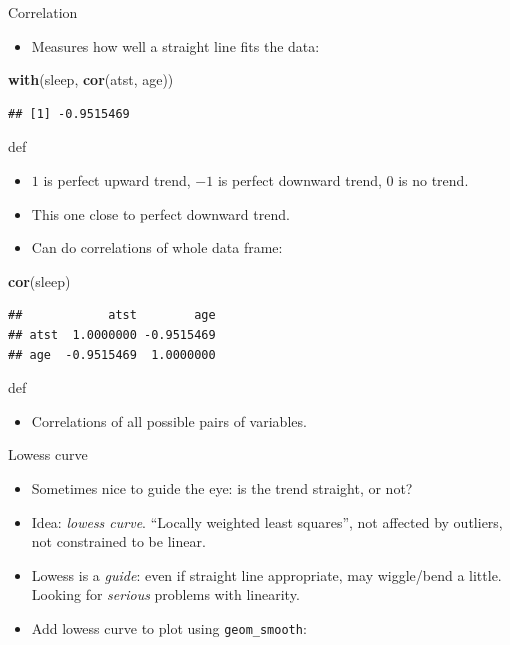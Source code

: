 \documentclass[ignorenonframetext,]{beamer}
\newenvironment{Shaded}{\begin{snugshade}}{\end{snugshade}}
\newcommand{\KeywordTok}[1]{\textcolor[rgb]{0.13,0.29,0.53}{\textbf{#1}}}
\newcommand{\NormalTok}[1]{#1}
\providecommand{\tightlist}{%
  \setlength{\itemsep}{0pt}\setlength{\parskip}{0pt}}
\begin{document}
\begin{frame}[fragile]{Correlation}
\protect\hypertarget{correlation}{}

\begin{itemize}
\tightlist
\item
  Measures how well a straight line fits the data:
\end{itemize}

\begin{Shaded}
\begin{Highlighting}[]
\KeywordTok{with}\NormalTok{(sleep, }\KeywordTok{cor}\NormalTok{(atst, age))}
\end{Highlighting}
\end{Shaded}

\begin{verbatim}
## [1] -0.9515469
\end{verbatim}

def

\begin{itemize}
\item
  \(1\) is perfect upward trend, \(-1\) is perfect downward trend, 0 is
  no trend.
\item
  This one close to perfect downward trend.
\item
  Can do correlations of whole data frame:
\end{itemize}

\begin{Shaded}
\begin{Highlighting}[]
\KeywordTok{cor}\NormalTok{(sleep)}
\end{Highlighting}
\end{Shaded}

\begin{verbatim}
##            atst        age
## atst  1.0000000 -0.9515469
## age  -0.9515469  1.0000000
\end{verbatim}

def

\begin{itemize}
\tightlist
\item
  Correlations of all possible pairs of variables.
\end{itemize}

\end{frame}

\begin{frame}[fragile]{Lowess curve}
\protect\hypertarget{lowess-curve}{}

\begin{itemize}
\item
  Sometimes nice to guide the eye: is the trend straight, or not?
\item
  Idea: \emph{lowess curve}. ``Locally weighted least squares'', not
  affected by outliers, not constrained to be linear.
\item
  Lowess is a \emph{guide}: even if straight line appropriate, may
  wiggle/bend a little. Looking for \emph{serious} problems with
  linearity.
\item
  Add lowess curve to plot using \texttt{geom\_smooth}:
\end{itemize}

\end{frame}
\end{document}
